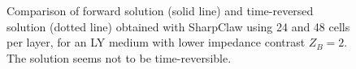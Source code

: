 \begin{figure} \centering
{}
\caption{Comparison of forward solution (solid line) and 
time-reversed solution (dotted line) obtained with SharpClaw 
using 24 and 48 cells per layer, for an LY medium
with lower impedance contrast $Z_B=2$.
The solution seems not to be time-reversible.
\label{fig:stego_ntr}}
\end{figure}




